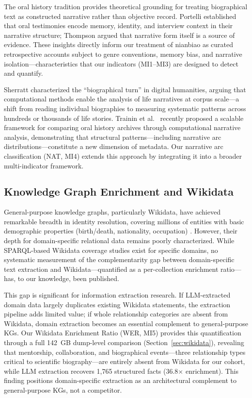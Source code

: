 \documentclass[review]{elsarticle}
\begin{document}
The oral history tradition provides theoretical grounding for treating biographical text as constructed narrative rather than objective record. Portelli \cite{portelli1991death} established that oral testimonies encode memory, identity, and interview context in their narrative structure; Thompson \cite{thompson2000voice} argued that narrative form itself is a source of evidence. These insights directly inform our treatment of nianbiao as curated retrospective accounts subject to genre conventions, memory bias, and narrative isolation—characteristics that our indicators (MI1--MI3) are designed to detect and quantify.

Sherratt \cite{sherratt2020biographical} characterized the ``biographical turn'' in digital humanities, arguing that computational methods enable the analysis of life narratives at corpus scale—a shift from reading individual biographies to measuring systematic patterns across hundreds or thousands of life stories. Trainin et al.\ \cite{trainin2026testimony} recently proposed a scalable framework for comparing oral history archives through computational narrative analysis, demonstrating that structural patterns—including narrative arc distributions—constitute a new dimension of metadata. Our narrative arc classification (NAT, MI4) extends this approach by integrating it into a broader multi-indicator framework.

\subsection{Knowledge Graph Enrichment and Wikidata}

General-purpose knowledge graphs, particularly Wikidata, have achieved remarkable breadth in identity resolution, covering millions of entities with basic demographic properties (birth/death, nationality, occupation) \cite{allisoncassin2018wikidata}. However, their depth for domain-specific relational data remains poorly characterized. While SPARQL-based Wikidata coverage studies exist for specific domains, no systematic measurement of the complementarity gap between domain-specific text extraction and Wikidata—quantified as a per-collection enrichment ratio—has, to our knowledge, been published.

This gap is significant for information extraction research. If LLM-extracted domain data largely duplicates existing Wikidata statements, the extraction pipeline adds limited value; if whole relationship categories are absent from Wikidata, domain extraction becomes an essential complement to general-purpose KGs. Our Wikidata Enrichment Ratio (WER, MI5) provides this quantification through a full 142~GB dump-level comparison (Section~\ref{sec:wikidata}), revealing that mentorship, collaboration, and biographical events—three relationship types critical to scientific biography—are entirely absent from Wikidata for our cohort, while LLM extraction recovers 1,765 structured facts (36.8$\times$ enrichment). This finding positions domain-specific extraction as an architectural complement to general-purpose KGs, not a competitor.
\end{document}
